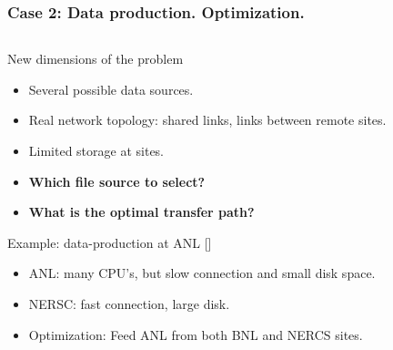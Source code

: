 \documentclass{beamer}
\begin{document}
\begin{frame}\frametitle{Case 2: Data production. Optimization. }
 	\begin{columns}[c] %
    \begin{footnotesize}
    \vspace{-20mm}
	\begin{block}{New dimensions of the problem}	
		\begin{itemize}		
			\item Several possible data sources.
			\item Real network topology: shared links, links between remote sites.
			\item Limited storage at sites.
			\item \textbf{Which file source to select?}
			\item \textbf{What is the optimal transfer path?}

		\end{itemize}
 	\end{block}
		\begin{block}{Example: data-production at ANL  [\cite{Balewski}]}	
		\begin{itemize}
			\item ANL: many CPU's, but slow connection and small disk space.
			\item NERSC: fast connection, large disk.
			\item Optimization: Feed ANL from both BNL and NERCS sites.		


\end{itemize}
\end{block}
\end{footnotesize}
\end{columns}
\end{frame}
\end{document}
